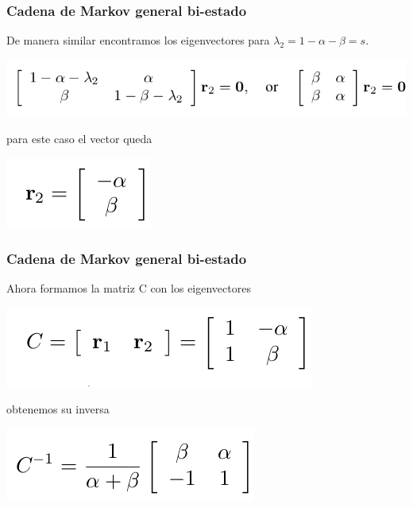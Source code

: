 \documentclass[spanish]{beamer}
\begin{document}
\begin{frame}
\frametitle{Cadena de Markov general bi-estado}
De manera similar encontramos los eigenvectores para $\lambda_{2}= 1-\alpha-\beta =s$. 

\begin{center}
\includegraphics[scale=0.4]{im7}
\end{center}
para este caso el vector queda 
\begin{center}
\includegraphics[scale=0.4]{im8}
\end{center}



\end{frame}
\begin{frame}
\frametitle{Cadena de Markov general bi-estado}
Ahora formamos la matriz C con los eigenvectores 

\begin{center}
\includegraphics[scale=0.4]{im9}
\end{center}

obtenemos su inversa

\begin{center}
\includegraphics[scale=0.4]{im10}
\end{center}

\end{frame}
\end{document}

